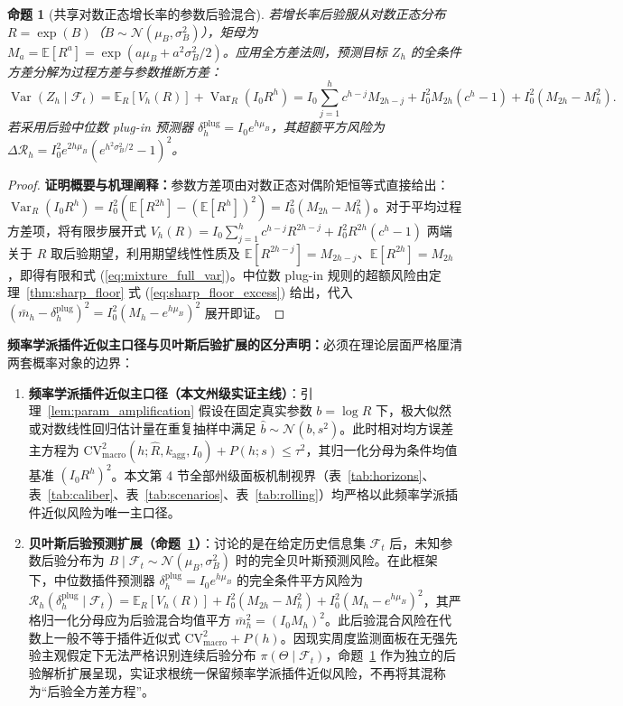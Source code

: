 \documentclass[11pt,a4paper]{article}
\theoremstyle{plain}
\newtheorem{proposition}{命题}
\theoremstyle{definition}
\begin{document}
\begin{proposition}[共享对数正态增长率的参数后验混合]\label{prop:posterior_mixture}
若增长率后验服从对数正态分布 $R = \exp(B)$（$B \sim \mathcal{N}(\mu_B, \sigma_B^2)$），矩母为 $M_a = \mathbb{E}[R^a] = \exp(a\mu_B + a^2\sigma_B^2/2)$。应用全方差法则，预测目标 $Z_h$ 的全条件方差分解为过程方差与参数推断方差：
\begin{equation}
\operatorname{Var}(Z_h \mid \mathcal{F}_t) = \mathbb{E}_R[V_h(R)] + \operatorname{Var}_R(I_0 R^h) = I_0 \sum_{j=1}^h c^{h-j} M_{2h-j} + I_0^2 M_{2h}(c^h - 1) + I_0^2(M_{2h} - M_h^2). \label{eq:mixture_full_var}
\end{equation}
若采用后验中位数 plug-in 预测器 $\delta_h^{\text{plug}} = I_0 e^{h\mu_B}$，其超额平方风险为 $\Delta \mathcal{R}_h = I_0^2 e^{2h\mu_B}(e^{h^2\sigma_B^2/2} - 1)^2$。
\end{proposition}

\begin{proof}
\textbf{证明概要与机理阐释：}参数方差项由对数正态对偶阶矩恒等式直接给出：$\operatorname{Var}_R(I_0 R^h) = I_0^2(\mathbb{E}[R^{2h}] - (\mathbb{E}[R^h])^2) = I_0^2(M_{2h} - M_h^2)$。对于平均过程方差项，将有限步展开式 $V_h(R) = I_0 \sum_{j=1}^h c^{h-j} R^{2h-j} + I_0^2 R^{2h}(c^h - 1)$ 两端关于 $R$ 取后验期望，利用期望线性性质及 $\mathbb{E}[R^{2h-j}] = M_{2h-j}$、$\mathbb{E}[R^{2h}] = M_{2h}$，即得有限和式 (\ref{eq:mixture_full_var})。中位数 plug-in 规则的超额风险由定理~\ref{thm:sharp_floor} 式 (\ref{eq:sharp_floor_excess}) 给出，代入 $(\bar{m}_h - \delta_h^{\text{plug}})^2 = I_0^2(M_h - e^{h\mu_B})^2$ 展开即证。
\end{proof}

\noindent\textbf{频率学派插件近似主口径与贝叶斯后验扩展的区分声明：}必须在理论层面严格厘清两套概率对象的边界：
\begin{enumerate}
\item \textbf{频率学派插件近似主口径（本文州级实证主线）}：引理~\ref{lem:param_amplification} 假设在固定真实参数 $b = \log R$ 下，极大似然或对数线性回归估计量在重复抽样中满足 $\hat{b} \sim \mathcal{N}(b, s^2)$。此时相对均方误差主方程为 $\text{CV}^2_{\text{macro}}(h; \hat{R}, k_{\text{agg}}, I_0) + P(h; s) \le \tau^2$，其归一化分母为条件均值基准 $(I_0 R^h)^2$。本文第 4 节全部州级面板机制视界（表~\ref{tab:horizons}、表~\ref{tab:caliber}、表~\ref{tab:scenarios}、表~\ref{tab:rolling}）均严格以此频率学派插件近似风险为唯一主口径。
\item \textbf{贝叶斯后验预测扩展（命题~\ref{prop:posterior_mixture}）}：讨论的是在给定历史信息集 $\mathcal{F}_t$ 后，未知参数后验分布为 $B \mid \mathcal{F}_t \sim \mathcal{N}(\mu_B, \sigma_B^2)$ 时的完全贝叶斯预测风险。在此框架下，中位数插件预测器 $\delta_h^{\text{plug}} = I_0 e^{h\mu_B}$ 的完全条件平方风险为 $\mathcal{R}_h(\delta_h^{\text{plug}} \mid \mathcal{F}_t) = \mathbb{E}_R[V_h(R)] + I_0^2(M_{2h} - M_h^2) + I_0^2(M_h - e^{h\mu_B})^2$，其严格归一化分母应为后验混合均值平方 $\bar{m}_h^2 = (I_0 M_h)^2$。此后验混合风险在代数上一般不等于插件近似式 $\text{CV}^2_{\text{macro}} + P(h)$。因现实周度监测面板在无强先验主观假定下无法严格识别连续后验分布 $\pi(\Theta \mid \mathcal{F}_t)$，命题~\ref{prop:posterior_mixture} 作为独立的后验解析扩展呈现，实证求根统一保留频率学派插件近似风险，不再将其混称为“后验全方差方程”。
\end{enumerate}
\end{document}
